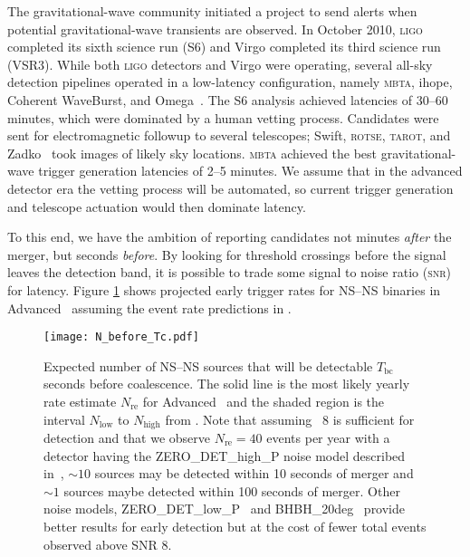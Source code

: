  The gravitational-wave community
initiated a project to send alerts when potential gravitational-wave transients
are observed.  In October 2010, \textsc{ligo} completed its sixth science run
(S6) and Virgo completed its third science run (VSR3).  While both
\textsc{ligo} detectors and Virgo were operating, several all-sky detection
pipelines operated in a low-latency configuration, namely \textsc{mbta}, ihope,
Coherent WaveBurst, and Omega~\cite{HugheyGWPAW2011, S6lowlatency}.
 The S6 analysis
achieved latencies of 30--60 minutes, which were dominated by a human vetting
process. Candidates were sent for electromagnetic followup to several
telescopes; Swift, \textsc{rotse}, \textsc{tarot}, and Zadko~\cite{kanner2008,
HugheyGWPAW2011} took images of likely sky locations.  \textsc{mbta} achieved
the best gravitational-wave trigger generation latencies of 2--5 minutes.  We
assume that in the advanced detector era the vetting process will be automated,
so current trigger generation and telescope actuation would then dominate
latency.

To this end, we have the ambition of reporting candidates not minutes
\emph{after} the merger, but seconds \emph{before}.  By looking for threshold
crossings before the signal leaves the detection band, it is possible to trade
some signal to noise ratio (\textsc{snr}) for latency.  Figure
\ref{fig:earlywarning} shows projected early trigger rates for NS--NS binaries
in Advanced \LIGO\ assuming the event rate predictions in
\cite{Abadie:2010p10836}.
%
\begin{figure}
\texttt{[image: N\_before\_Tc.pdf]}
\caption{\label{fig:earlywarning} Expected number of NS--NS sources that will
be detectable $T_\mathrm{bc}$ seconds before coalescence.  The solid line is the most
likely yearly rate estimate $N_{\mathrm{re}}$ for Advanced \LIGO\ and the
shaded region is the interval $N_{\mathrm{low}}$ to $N_{\mathrm{high}}$ from
\cite{Abadie:2010p10836}.  Note that assuming \SNR\ 8 is sufficient for
detection and that we observe $N_{\mathrm{re}} = 40$ events per year with a
detector having the ZERO\_DET\_high\_P noise model described
in~\cite{ALIGONoiseZERO_DET_high_P}, $\sim10$ sources may be detected within 10
seconds of merger and $\sim1$ sources maybe detected within 100 seconds of
merger.  Other noise models, ZERO\_DET\_low\_P~\cite{ALIGONoiseZERO_DET_low_P}
and BHBH\_20deg~\cite{ALIGONoiseBHBH_20deg} provide better results for early
detection but at the cost of fewer total events observed above SNR 8.}
\end{figure}

